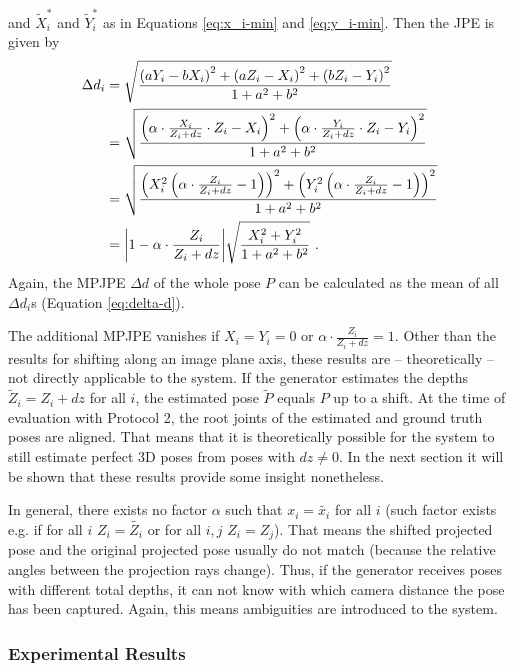 and $\widetilde{X}_i^\ast$ and $\widetilde{Y}_i^\ast$ as in Equations \eqref{eq:x_i-min} and \eqref{eq:y_i-min}.
Then the JPE  is given by 
\begin{align}
	\label{eq:z-shift-error}
	\Delta d_i &= \sqrt{\frac{\left (a Y_i - b X_i \right )^2 + \left (a Z_i - X_i \right )^2 + \left (b Z_i - Y_i \right )^2}{1 + a^2 + b^2}} \\ 
	&= \sqrt{\frac{\left (\alpha \cdot \frac{X_i}{Z_i + dz}\cdot Z_i - X_i \right )^2 + \left (\alpha \cdot \frac{Y_i }{Z_i + dz}\cdot Z_i- Y_i \right )^2}{1 + a^2 + b^2}} \\
	&= \sqrt{\frac{\left (X_i^2 \left (\alpha \cdot \frac{Z_i}{Z_i + dz} - 1 \right) \right )^2 + \left (Y_i^2 \left (\alpha \cdot \frac{Z_i}{Z_i + dz}-1 \right ) \right )^2}{1 + a^2 + b^2}} \\
	&= \abs{1 - \alpha \cdot \frac{Z_i}{Z_i + dz}}  \sqrt{\frac{X_i^2 + Y_i^2}{1 + a^2 + b^2}}\ .
\end{align}
Again, the MPJPE $\Delta d$ of the whole pose $P$ can be calculated as the mean of all $\Delta d_i$s (Equation \eqref{eq:delta-d}).

The additional MPJPE vanishes if $X_i = Y_i = 0$ or $\alpha \cdot \frac{Z_i}{Z_i + dz} = 1$.
Other than the results for shifting along an image plane axis, these results are -- theoretically -- not directly applicable to the system.
If the generator estimates the depths $\widetilde{Z}_i = Z_i + dz$ for all $i$, the estimated pose $\widetilde{P}$ equals $P$ up to a shift.
At the time of evaluation with Protocol 2, the root joints of the estimated and ground truth poses are aligned.
That means that it is theoretically possible for the system to still estimate perfect 3D poses from poses with $dz \neq 0$.
In the next section it will be shown that these results provide some insight nonetheless.

In general, there exists no factor $\alpha$ such that $x_i = \widetilde{x_i}$ for all $i$ (such factor exists e.g. if for all $i$ $Z_i = \widetilde{Z_i}$ or for all $i, j$ $Z_i = Z_j$).
That means the shifted projected pose and the original projected pose usually do not match (because the relative angles between the projection rays change).
Thus, if the generator receives poses with different total depths, it can not know with which camera distance the pose has been captured.
Again, this means ambiguities are introduced to the system.

\subsubsection{Experimental Results}
\label{sec:error-on-shift-experimental}

